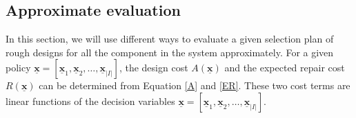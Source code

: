 \documentclass[preprint,12pt]{elsarticle}
\begin{document}


%

\subsection{Approximate evaluation}

In this section, we will use different ways to evaluate a given selection plan of rough designs for all the component in the system approximately. For a given policy $\boldsymbol{\underline{x}}=[\boldsymbol{\underline{x}}_{1},\boldsymbol{\underline{x}}_{2},\dots,\boldsymbol{\underline{x}}_{\lvert I \rvert}]$, the design cost $A(\boldsymbol{\underline{x}})$ and the expected repair cost $R(\boldsymbol{\underline{x}})$ can be determined from Equation \eqref{A} and \eqref{ER}. These two cost terms are linear functions of the decision variables $\underline{\boldsymbol{x}}=[\boldsymbol{\underline{x}}_{1},\boldsymbol{\underline{x}}_{2},\dots,\boldsymbol{\underline{x}}_{\lvert I \rvert}]$.
\end{document}
